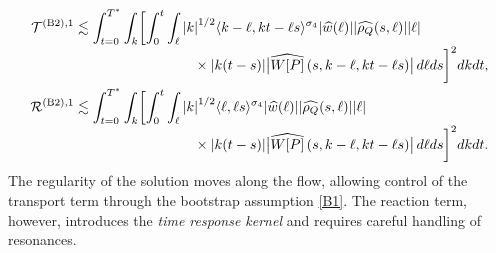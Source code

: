 \documentclass[JEP,XML,SOM,Unicode]{cedram}
\newcommand{\babs}[1]{\bigl|#1\bigr|}
\theoremstyle{plain}
\theoremstyle{remark}
\newcommand{\br}[1]{\left(#1\right)}
\newcommand{\ak}{\abs{k}}
\newcommand{\jb}[1]{\langle#1\rangle}
\begin{document}
\begin{align*}
\mathcal{T}^{\mathrm{(B2),1}}&\lesssim\int_{t=0}^{T^*}\int_k\biggl[\int_0^t\int_\ell\ak^{1/2}\jb{k-\ell,kt-\ell s}^{\sigma_4}\abs{\widehat w(\ell)}\abs{\widehat{\rho_Q}(s,\ell)} \abs{\ell}\\[-3pt]
&\hspace{3cm}\times\abs{k(t-s)}\babs{\widehat {W[P]}\br{s,k-\ell,kt-\ell s}}\,d\ell ds\biggr]^2dkdt,\\
\mathcal{R}^{\mathrm{(B2),1}}&\lesssim\int_{t=0}^{T^*}\int_k\biggl[\int_0^t\int_\ell\ak^{1/2}\jb{\ell,\ell s}^{\sigma_4}\abs{\widehat w(\ell)}\abs{\widehat{\rho_Q}(s,\ell)} \abs{\ell}\\[-3pt]
&\hspace{3cm}\times\abs{k(t-s)}\babs{\widehat {W[P]}\br{s,k-\ell,kt-\ell s}}\,d\ell ds\biggr]^2dkdt.
\end{align*}The regularity of the solution moves along the flow, allowing control of the transport term through the bootstrap assumption \eqref{B1}. The reaction term, however, introduces the \textit{time response kernel} and requires careful handling of resonances.
\end{document}
